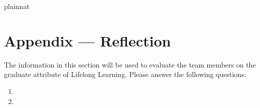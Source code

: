 \documentclass[12pt, titlepage]{article}
\begin{document}

 {plainnat}


\newpage{}
\section*{Appendix --- Reflection}

The information in this section will be used to evaluate the team members on the
graduate attribute of Lifelong Learning.  Please answer the following questions:

\begin{enumerate}
  \item 
  \item 
\end{enumerate}
\end{document}
